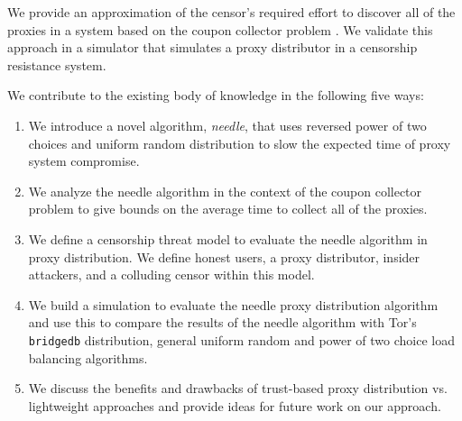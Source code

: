 We provide an approximation of the censor's required effort to discover all of the proxies in a system based on the coupon collector problem \cite{flajolet1992birthday}. We validate this approach in a simulator that simulates a proxy distributor in a censorship resistance system. 

We contribute to the existing body of knowledge in the following five ways:
\begin{enumerate}
    \item We introduce a novel algorithm, \emph{needle}, that uses reversed power of two choices and uniform random distribution to slow the expected time of proxy system compromise.
    \item We analyze the needle algorithm in the context of the coupon collector problem to give bounds on the average time to collect all of the proxies.
    \item We define a censorship threat model to evaluate the needle algorithm in proxy distribution. We define honest users, a proxy distributor, insider attackers, and a colluding censor within this model.
    \item We build a simulation to evaluate the needle proxy distribution algorithm and use this to compare the results of the needle algorithm with Tor's \texttt{bridgedb} distribution, general uniform random and power of two choice load balancing algorithms. 
    \item We discuss the benefits and drawbacks of trust-based proxy distribution vs. lightweight approaches and provide ideas for future work on our approach.
\end{enumerate}